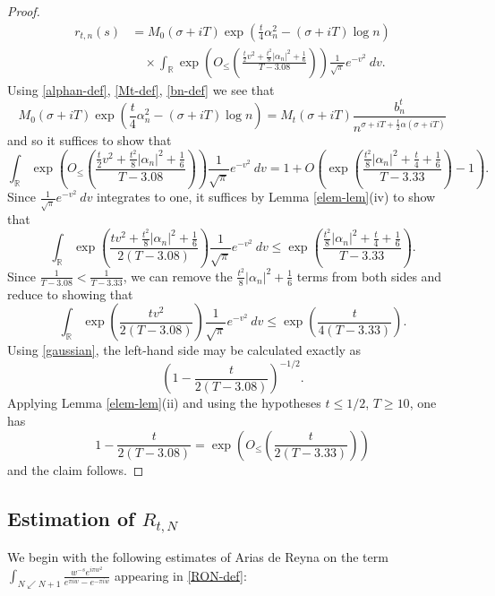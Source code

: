 \documentclass[a4paper,11pt,twoside]{amsart}
\newcommand\R{\mathbb{R}}
\begin{document}
\begin{proof}
\begin{align*}
 r_{t,n}(s) &= M_0(\sigma+iT) \exp\left( \frac{t}{4} \alpha_n^2 - (\sigma+iT) \log n\right)  \\
&\quad \times  \int_\R \exp\left(  O_{\leq}\left( \frac{\frac{t}{2}v^2 + \frac{t^2}{8} |\alpha_n|^2 + \frac{1}{6}}{T-3.08} \right) \right) \frac{1}{\sqrt{\pi}} e^{-v^2}\ dv.
\end{align*}
Using \eqref{alphan-def}, \eqref{Mt-def}, \eqref{bn-def} we see that
$$ M_0(\sigma+iT) \exp\left( \frac{t}{4} \alpha_n^2 - (\sigma+iT) \log n\right) = M_t(\sigma+iT) \frac{b_n^t}{n^{\sigma+iT+\frac{t}{2} \alpha(\sigma+iT)}} $$
and so it suffices to show that
$$  \int_\R \exp\left( O_{\leq}\left( \frac{\frac{t}{2}v^2 + \frac{t^2}{8} |\alpha_n|^2 + \frac{1}{6}}{T-3.08} \right) \right)\frac{1}{\sqrt{\pi}} e^{-v^2}\ dv = 1 + O\left(\exp\left( \frac{\frac{t^2}{8} |\alpha_n|^2 + \frac{t}{4} + \frac{1}{6}}{T-3.33} \right)-1\right).$$
Since $\frac{1}{\sqrt{\pi}} e^{-v^2}\ dv $ integrates to one, it suffices by Lemma \ref{elem-lem}(iv) to show that
$$
  \int_\R \exp\left( \frac{t v^2+ \frac{t^2}{8} |\alpha_n|^2 + \frac{1}{6}}{2(T-3.08)} \right) \frac{1}{\sqrt{\pi}} e^{-v^2}\ dv \leq \exp\left( \frac{\frac{t^2}{8} |\alpha_n|^2 + \frac{t}{4} + \frac{1}{6}}{T-3.33} \right).
$$
Since $\frac{1}{T-3.08} < \frac{1}{T-3.33}$, we can remove the $\frac{t^2}{8} |\alpha_n|^2 + \frac{1}{6}$ terms from both sides and reduce to showing that
\begin{equation}\label{ax}
  \int_\R \exp\left( \frac{t v^2}{2(T-3.08)} \right) \frac{1}{\sqrt{\pi}} e^{-v^2}\ dv \leq \exp\left( \frac{t}{4(T-3.33)} \right).
	\end{equation}
Using \eqref{gaussian}, the left-hand side may be calculated exactly as
$$ \left(1 - \frac{t}{2(T-3.08)}\right)^{-1/2}.$$
Applying Lemma \ref{elem-lem}(ii) and using the hypotheses $t \leq 1/2$, $T \geq 10$, one has
$$ 1 - \frac{t}{2(T-3.08)} = \exp\left( O_{\leq}\left( \frac{t}{2(T-3.33)} \right)\right)$$
and the claim follows.
\end{proof}

\subsection{Estimation of $R_{t,N}$}

We begin with the following estimates of Arias de Reyna \cite{arias} on the term $\int_{N \swarrow N+1} \frac{w^{-s} e^{i\pi w^2}}{e^{\pi i w} - e^{-\pi i w}}$ appearing in \eqref{RON-def}:
\end{document}
